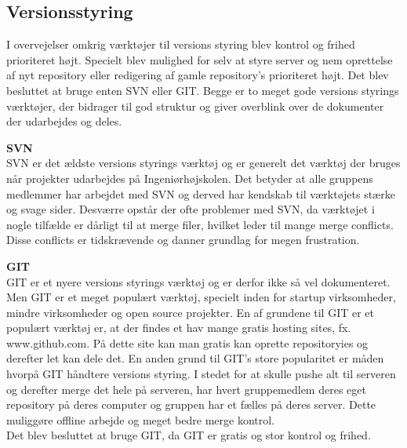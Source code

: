\subsection*{Versionsstyring}
I overvejelser omkrig værktøjer til versions styring blev kontrol og frihed prioriteret højt. Specielt blev mulighed for selv at styre server og nem oprettelse af nyt repository eller redigering af gamle repository's prioriteret højt.
Det blev besluttet at bruge enten SVN eller GIT. Begge er to meget gode versions styrings værktøjer, der bidrager til god struktur og giver overblink over de dokumenter der udarbejdes og deles. 


\textbf{SVN} \\
SVN er det ældste versions styrings værktøj og er generelt det værktøj der bruges når projekter udarbejdes på Ingeniørhøjskolen. Det betyder at alle gruppens medlemmer har arbejdet med SVN og derved har kendskab til værktøjets stærke og svage sider. 
Desværre opstår der ofte problemer med SVN, da værktøjet i nogle tilfælde er dårligt til at merge filer, hvilket leder til mange merge conflicts. Disse conflicts er tidskrævende og danner grundlag for megen frustration. 

\textbf{GIT} \\
GIT er et nyere versions styrings værktøj og er derfor ikke så vel dokumenteret.
Men GIT er et meget populært værktøj, specielt inden for startup virksomheder, mindre virksomheder og open source projekter. 
En af grundene til GIT er et populært værktøj er, at der findes et hav mange gratis hosting sites, fx. www.github.com. På dette site kan man gratis kan oprette repositoryies og derefter let kan dele det. 
En anden grund til GIT's store popularitet er måden hvorpå GIT håndtere versions styring. I stedet for at skulle pushe alt til serveren og derefter merge det hele på serveren, har hvert gruppemedlem deres eget repository på deres computer og gruppen har et fælles på deres server. Dette muliggøre offline arbejde og meget bedre merge kontrol. \\

Det blev besluttet at bruge GIT, da GIT er gratis og stor kontrol og frihed.